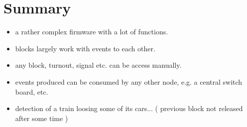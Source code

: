 \section{Summary}

\begin{itemize}
\begin{itemize}
\item a rather complex firmware with a lot of functions.
\item blocks largely work with events to each other.
\item any block, turnout, signal etc. can be access manually.
\item events produced can be consumed by any other node, e.g. a central switch board, etc.
\item detection of a train loosing some of its cars... ( previous block not released after some time )
\end{itemize}
\end{itemize}
